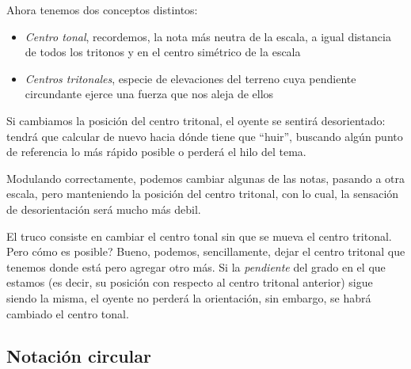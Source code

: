 \documentclass[]{report}
\providecommand{\tightlist}{%
  \setlength{
\itemsep}{0pt}\setlength{\parskip}{0pt}}
\begin{document}
Ahora tenemos dos conceptos distintos:
\begin{itemize}   \tightlist
  \item \emph{Centro tonal}, recordemos, la nota más neutra de la escala, a igual distancia de todos los tritonos y en el centro simétrico de la escala
  \item \emph{Centros tritonales}, especie de elevaciones del terreno cuya pendiente circundante ejerce una fuerza que nos aleja de ellos
\end{itemize}
 

Si cambiamos la posición del centro tritonal, el oyente se sentirá desorientado: tendrá que calcular de nuevo hacia dónde tiene que ``huir'', buscando algún punto de referencia lo más rápido posible o perderá el hilo del tema.

Modulando correctamente, podemos cambiar algunas de las notas, pasando a otra escala, pero manteniendo la posición del centro tritonal, con lo cual, la sensación de desorientación será mucho más debil.

El truco consiste en cambiar el centro tonal sin que se mueva el centro tritonal. Pero cómo es posible? Bueno, podemos, sencillamente, dejar el centro tritonal que tenemos donde está pero agregar otro más. Si la \emph{pendiente} del grado en el que estamos (es decir, su posición con respecto al centro tritonal anterior) sigue siendo la misma, el oyente no perderá la orientación, sin embargo, se habrá cambiado el centro tonal.

\subsection{Notación circular}
\end{document}
